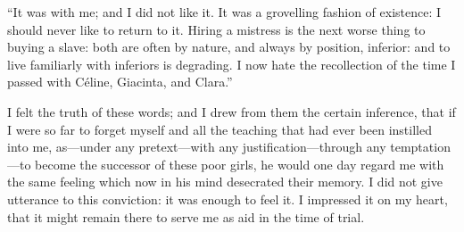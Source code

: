 \enquote{It was with me; and I did not like it. It was a grovelling
fashion of existence: I should never like to return to it. Hiring a
mistress is the next worse thing to buying a slave: both are often by
nature, and always by position, inferior: and to live familiarly with
inferiors is degrading. I now hate the recollection of the time I
passed with Céline, Giacinta, and Clara.}

I felt the truth of these words; and I drew from them the certain
inference, that if I were so far to forget myself and all the teaching
that had ever been instilled into me, as---under any pretext---with any
justification---through any temptation---to become the successor of
these poor girls, he would one day regard me with the same feeling which
now in his mind desecrated their memory. I did not give utterance to
this conviction: it was enough to feel it. I impressed it on my heart,
that it might remain there to serve me as aid in the time of trial.

